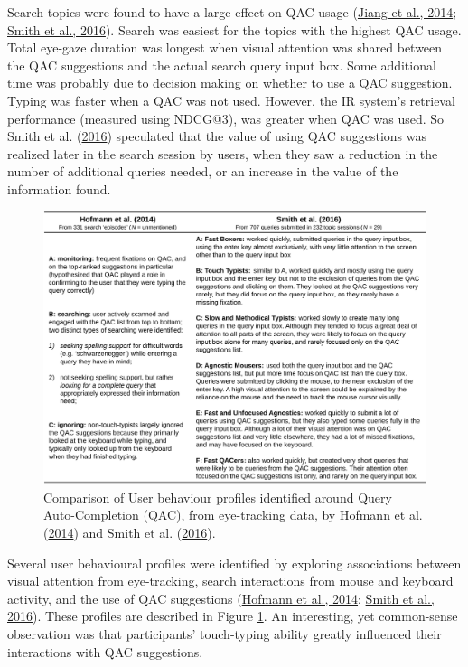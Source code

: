 \documentclass[letterpaper, nobind]{templates/ociamthesis}
\begin{document}
Search topics were found to have a large effect on QAC usage
(\protect\hyperlink{ref-126}{Jiang et al., 2014}; \protect\hyperlink{ref-129}{Smith et al., 2016}). Search was easiest for the topics with the highest QAC
usage. Total eye-gaze duration was longest when visual attention was
shared between the QAC suggestions and the actual search query input
box. Some additional time was probably due to decision making on whether
to use a QAC suggestion. Typing was faster when a QAC was not used.
However, the IR system's retrieval performance (measured using NDCG@3),
was greater when QAC was used. So Smith et al. (\protect\hyperlink{ref-129}{2016}) speculated that the value of
using QAC suggestions was realized later in the search session by users,
when they saw a reduction in the number of additional queries needed, or
an increase in the value of the information found.

\begin{figure}

{\centering \includegraphics[width=1\linewidth]{figs/res-Q-QAC-profiles} 

}

\caption[Comparison of User behaviour profiles identified around Query Auto-Completion from eye-tracking data.]{Comparison of User behaviour profiles identified around Query Auto-Completion (QAC), from eye-tracking data, by Hofmann et al. (\protect\hyperlink{ref-125}{2014}) and Smith et al. (\protect\hyperlink{ref-129}{2016}).}\label{fig:res-Q-QAC-profiles}
\end{figure}





Several user behavioural profiles were identified by exploring
associations between visual attention from eye-tracking, search
interactions from mouse and keyboard activity, and the use of QAC
suggestions (\protect\hyperlink{ref-125}{Hofmann et al., 2014}; \protect\hyperlink{ref-129}{Smith et al., 2016}). These profiles are described in
Figure \ref{fig:res-Q-QAC-profiles}. An interesting, yet common-sense
observation was that participants' touch-typing ability greatly
influenced their interactions with QAC suggestions.
\end{document}
